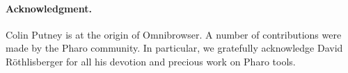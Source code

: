\documentclass[a4paper,10pt,twoside]{book}
\begin{document}
\paragraph{Acknowledgment.}  Colin Putney is at the origin of Omnibrowser. A number of contributions were made by the Pharo community. In particular, we gratefully acknowledge David R\"othlisberger for all his devotion and precious work on Pharo tools.



%
% 


\end{document}
